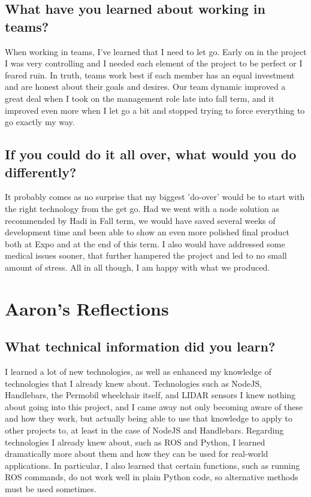\documentclass[onecolumn, draftclsnofoot,10pt, compsoc]{report}
\begin{document}
\subsection{What have you learned about working in teams?}
When working in teams, I've learned that I need to let go. Early on in the project I was very controlling and I needed each element of the project to be perfect or I feared ruin. In truth, teams work best if each member has an equal investment and are honest about their goals and desires. Our team dynamic improved a great deal when I took on the management role late into fall term, and it improved even more when I let go a bit and stopped trying to force everything to go exactly my way. 
\subsection{If you could do it all over, what would you do differently?}
It probably comes as no surprise that my biggest 'do-over' would be to start with the right technology from the get go. Had we went with a node solution as recommended by Hadi in Fall term, we would have saved several weeks of development time and been able to show an even more polished final product both at Expo and at the end of this term. I also would have addressed some medical issues sooner, that further hampered the project and led to no small amount of stress. All in all though, I am happy with what we produced. 
\section{Aaron's Reflections}
\subsection{What technical information did you learn?}
I learned a lot of new technologies, as well as enhanced my knowledge of technologies that I already knew about. Technologies such as NodeJS, Handlebars, the Permobil wheelchair itself, and LIDAR sensors I knew nothing about going into this project, and I came away not only becoming aware of these and how they work, but actually being able to use that knowledge to apply to other projects to, at least in the case of NodeJS and Handlebars. Regarding technologies I already knew about, such as ROS and Python, I learned dramatically more about them and how they can be used for real-world applications. In particular, I also learned that certain functions, such as running ROS commands, do not work well in plain Python code, so alternative methods must be used sometimes.
\end{document}
